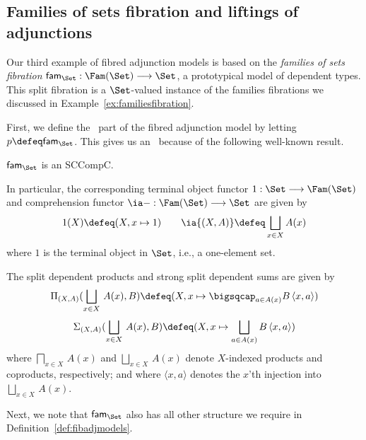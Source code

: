 \subsection{Families of sets fibration and liftings of adjunctions}
\label{sect:fibadjmodelsfromfamiliesofsets}

Our third example of fibred adjunction models is based on the \emph{families of sets fibration} 
$\mathsf{fam}_{\Set} : \Fam(\Set) \longrightarrow \Set$, a prototypical model of dependent types. This split fibration is a $\Set$-valued instance of the families fibrations we discussed  in Example~\ref{ex:familiesfibration}. 

First, we define the \SCCompC\, part of the fibred adjunction model by letting \linebreak $p \defeq \mathsf{fam}_{\Set}$. This gives us an \SCCompC\, because of the following well-known result. 

\begin{proposition}
\label{prop:familiesofsetsissccompc}
$\mathsf{fam}_{\Set}$ is an SCCompC.
\end{proposition}

In particular, the corresponding terminal object functor $1 : \Set \longrightarrow \Fam(\Set)$ and  comprehension functor $\ia - : \Fam(\Set) \longrightarrow \Set$ are given by
\[
1(X) \defeq (X , x \mapsto 1) \qquad
\ia {(X,A)} \defeq \bigsqcup_{x \in X } A(x)
\]
where $1$ is the terminal object in $\Set$, i.e., a one-element set.

The split dependent products and strong split dependent sums are given by
\[
\Pi_{(X,A)}(\bigsqcup_{x \in X}\, A(x), B) \defeq (X , x \mapsto \bigsqcap_{a \in A(x)} B \,\langle x , a \rangle)
\]
\[
\Sigma_{(X,A)}(\bigsqcup_{x \in X}\, A(x), B) \defeq (X , x \mapsto \bigsqcup_{a \in A(x)} B \,\langle x , a \rangle)
\]
where $\bigsqcap_{x \in  X}\, A(x)$ and $\bigsqcup_{x \in  X}\, A(x)$ denote $X$-indexed products and coproducts, respectively; and where $\langle x , a \rangle$ denotes the $x$'th injection into $\bigsqcup_{x \in  X}\, A(x)$. 

Next, we note that $\mathsf{fam}_{\Set}$ also has all other structure we require in Definition~\ref{def:fibadjmodels}.


